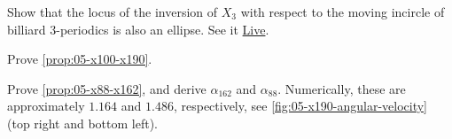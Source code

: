 \begin{question}
Show that the locus of the inversion of $X_3$ with respect to the moving incircle of billiard 3-periodics is also an ellipse. See it \href{https://bit.ly/2SwDLa4}{Live}.
\end{question}

\begin{question}
Prove \cref{prop:05-x100-x190}.
\end{question}

\begin{question}
Prove \cref{prop:05-x88-x162}, and derive $\alpha_{162}$ and $\alpha_{88}$. Numerically, these are approximately $1.164$ and $1.486$, respectively, see \cref{fig:05-x190-angular-velocity} (top right and bottom left).
\end{question}